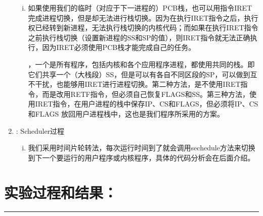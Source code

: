 \documentclass[UTF8]{article}
\newcommand{\red}{\color{red}}
\begin{document}
\begin{enumerate}[1)]
\begin{enumerate}[i)]
					\item 如果使用我们的临时（对应于下一进程的）PCB栈，也可以用指令IRET完成进程切换，但是却无法进行栈切换。因为在执行IRET指令之后，执行权已经转到新进程，无法执行栈切换的内核代码；而如果在执行IRET指令之前执行栈切换（设置新进程的SS和SP的值），则IRET指令就无法正确执行，因为IRET必须使用PCB栈才能完成自己的任务。

					，一个是所有程序，包括内核和各个应用程序进程，都使用共同的栈。即它们共享一个（大栈段）SS，但是可以有各自不同区段的SP，可以做到互不干扰，也能够用IRET进行进程切换。第二种方法，是不使用IRET指令，而是改用RETF指令，但必须自己恢复FLAGS和SS。第三种方法，使用IRET指令，在用户进程的栈中保存IP、CS和FLAGS，但必须将IP、CS和FLAGS 放回用户进程栈中，这也是我们程序所采用的方案。
			\end{enumerate}
			\item {\red{}: Scheduler过程}
				\begin{enumerate}[i)]
					\item 我们采用时间片轮转法，每次运行时间到了就会调用sechedule方法来切换到下一个要运行的用户程序或内核程序，具体的代码分析会在后面介绍。
			\end{enumerate}
\end{enumerate}

\section{实验过程和结果：}
\noindent\rule[0.2\baselineskip]{\textwidth}{0.5pt}\\[-32pt]
\heiti\setlength{\itemsep}{0em} 
\setlength{\parskip}{1em}
\end{document}
